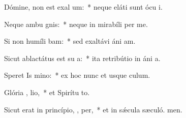 \item Dómine, non est exal  um:~* neque eláti sunt ócu i.
\item Neque ambu  gnis:~* neque in mirabíli per me.
\item Si non humíli bam:~* sed exaltávi áni am.
\item Sicut ablactátus est su  a:~* ita retribútio in áni a.
\item Speret Is  mino:~* ex hoc nunc et usque  culum.
\item Glória ,  lio,~* et Spirítu to.
\item Sicut erat in princípio,  ,  per,~* et in sǽcula sæculó. men.
